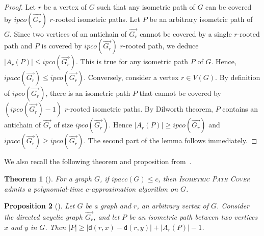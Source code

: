 \documentclass[a4paper]{article}
\newcommand{\IPC}{\textsc{Isometric Path Cover}\xspace}
\newcommand{\dist}[2]{\mathsf{d}\left(#1,#2\right)}
\newcommand{\anticp}[2]{A_{#1}\left(#2\right)}
\newcommand{\ipcor}[2]{ipco\left(\overrightarrow{#2_{#1}}\right)}
\newcommand{\ipac}[1]{ipacc\left(#1\right)}
\newcommand{\ipco}[1]{ipco\left(#1\right)}
\newtheorem{theorem}{Theorem}
\newtheorem{proposition}[theorem]{Proposition}
\begin{document}
\begin{proof}
Let $r$ be a vertex of $G$ such that any isometric path of $G$ can be
covered by $\ipcor{r}{G}$ $r$-rooted isometric paths. Let $P$ be an
arbitrary isometric path of $G.$ Since two vertices of an antichain of
$\overrightarrow{G_r}$ cannot be covered by a single $r$-rooted path and
$P$ is covered by $\ipcor{r}{G}$ $r$-rooted path, we deduce $|\anticp{r}{P}|\le
\ipcor{r}{G}$. This is true for any isometric path $P$ of $G$. Hence,
$ \ipac{\overrightarrow{G_r}} \leq \ipcor{r}{G}$. Conversely, consider a vertex $r\in V(G).$ By definition of $\ipcor{r}{G}$,
there is an isometric path $P$ that cannot be covered by $(\ipcor{r}{G}-1)$
$r$-rooted isometric paths. By Dilworth theorem, $P$ contains an
antichain of $\overrightarrow{G_r}$ of size $\ipcor{r}{G}.$ Hence
$|A_r(P)|\geq \ipcor{r}{G}$ and $\ipac{\overrightarrow{G_r}}\geq \ipcor{r}{G}$.
The second part of the lemma follows immediately.
\end{proof}

We also recall the following theorem and proposition from~\cite{ChakrabortyD0FG22}. 

\begin{theorem}[\cite{ChakrabortyD0FG22}]\label{thm:ipac-approx}
For a graph $G$, if $\ipac{G} \leq c$, then \IPC admits a {polynomial-time} $c$-approximation algorithm on $G$.
\end{theorem}



\begin{proposition}[\cite{ChakrabortyD0FG22}]\label{prp:antichain-length}
Let $G$ be a graph and $r$, an arbitrary vertex of $G$. Consider the directed acyclic graph $\overrightarrow{G_r}$, and let $P$ be an isometric path between two vertices $x$ and $y$ in $G$. Then $|P|\geq |\dist{r}{x}-\dist{r}{y}| + |\anticp{r}{P}| - 1$. 
\end{proposition}
\end{document}
